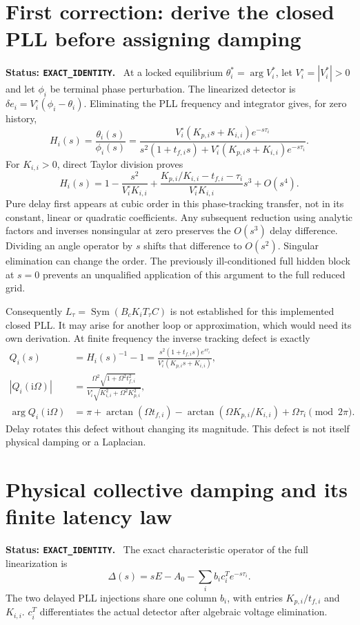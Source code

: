 \documentclass[11pt]{article}
\newcommand{\ii}{\mathrm{i}}
\newcommand{\status}[1]{\par\smallskip\noindent\textbf{Status: \texttt{#1}.}\ }
\begin{document}
\clearpage
\appendix
\section{First correction: derive the closed PLL before assigning damping}
\status{EXACT\_IDENTITY}
At a locked equilibrium $\theta_i^*=\arg V_i^*$, let
$V_i^\circ=|V_i^*|>0$ and let $\phi_i$ be terminal phase perturbation.
The linearized detector is $\delta e_i=V_i^\circ(\phi_i-\theta_i)$.
Eliminating the PLL frequency and integrator gives, for zero history,
\begin{equation}
 H_i(s)=\frac{\theta_i(s)}{\phi_i(s)}
 =\frac{V_i^\circ(K_{p,i}s+K_{i,i})e^{-s\tau_i}}
 {s^2(1+t_{f,i}s)+V_i^\circ(K_{p,i}s+K_{i,i})e^{-s\tau_i}}. \label{eq:H}
\end{equation}
For $K_{i,i}>0$, direct Taylor division proves
\begin{equation}
 H_i(s)=1-\frac{s^2}{V_i^\circ K_{i,i}}
 +\frac{K_{p,i}/K_{i,i}-t_{f,i}-\tau_i}{V_i^\circ K_{i,i}}s^3+O(s^4).
 \label{eq:series}
\end{equation}
Pure delay first appears at cubic order in this phase-tracking transfer,
not in its constant, linear or quadratic coefficients.
Any subsequent reduction using analytic factors and inverses nonsingular
at zero preserves the $O(s^3)$ delay difference. Dividing an angle
operator by $s$ shifts that difference to $O(s^2)$.
Singular elimination can change the order. The previously ill-conditioned
full hidden block at $s=0$ prevents an unqualified application of this
argument to the full reduced grid.

Consequently $L_\tau=\operatorname{Sym}(B_cK_iT_\tau C)$ is not established
for this implemented closed PLL. It may arise for another loop or
approximation, which would need its own derivation.
At finite frequency the inverse tracking defect is exactly
\begin{align}
 Q_i(s)&=H_i(s)^{-1}-1
 =\frac{s^2(1+t_{f,i}s)e^{s\tau_i}}{V_i^\circ(K_{p,i}s+K_{i,i})},\\
 |Q_i(\ii\Omega)|&=
 \frac{\Omega^2\sqrt{1+\Omega^2t_{f,i}^2}}
 {V_i^\circ\sqrt{K_{i,i}^2+\Omega^2K_{p,i}^2}},\\
 \arg Q_i(\ii\Omega)&=\pi+\arctan(\Omega t_{f,i})
 -\arctan(\Omega K_{p,i}/K_{i,i})+\Omega\tau_i\pmod{2\pi}.
\end{align}
Delay rotates this defect without changing its magnitude. This defect
is not itself physical damping or a Laplacian.

\section{Physical collective damping and its finite latency law}\label{app:physical}
\status{EXACT\_IDENTITY}
The exact characteristic operator of the full linearization is
\[
 \Delta(s)=sE-A_0-\sum_i b_ic_i^T e^{-s\tau_i}.
\]
The two delayed PLL injections share one column $b_i$, with entries
$K_{p,i}/t_{f,i}$ and $K_{i,i}$. $c_i^T$ differentiates the actual
detector after algebraic voltage elimination.
\end{document}
